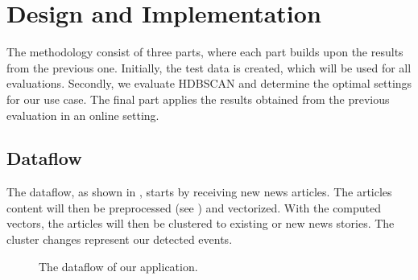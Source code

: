 \section{Design and Implementation}
\label{sec:4_design_and_implementation}

The methodology consist of three parts, where each part builds upon the results from the previous one.
Initially, the test data is created, which will be used for all evaluations.
Secondly, we evaluate HDBSCAN and determine the optimal settings for our use case.
The final part applies the results obtained from the previous evaluation in an online setting.

\subsection{Dataflow}
\label{subsec:4_dataflow}

The dataflow, as shown in , starts by receiving new news articles.
The articles content will then be preprocessed (see )
and vectorized.
With the computed vectors, the articles will then be clustered to existing or new news stories.
The cluster changes represent our detected events.

\begin{figure}[!htb]
    \centering

    \caption{The dataflow of our application.}
    \label{fig:dataflow}
\end{figure}




